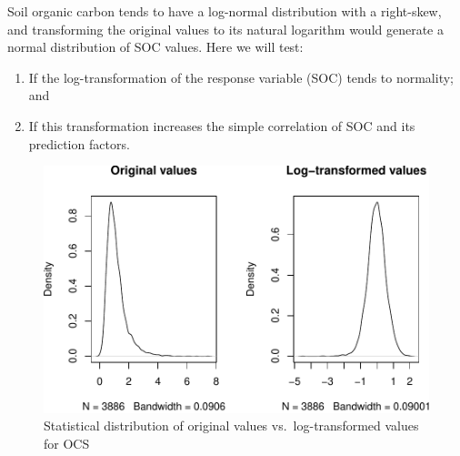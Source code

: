\documentclass[10pt,b5paper,]{book}
\newenvironment{Shaded}{\begin{snugshade}}{\end{snugshade}}
\newcommand{\CommentTok}[1]{\textcolor[rgb]{0.56,0.35,0.01}{\textit{#1}}}
\newcommand{\DataTypeTok}[1]{\textcolor[rgb]{0.13,0.29,0.53}{#1}}
\newcommand{\DecValTok}[1]{\textcolor[rgb]{0.00,0.00,0.81}{#1}}
\newcommand{\KeywordTok}[1]{\textcolor[rgb]{0.13,0.29,0.53}{\textbf{#1}}}
\newcommand{\NormalTok}[1]{#1}
\newcommand{\OperatorTok}[1]{\textcolor[rgb]{0.81,0.36,0.00}{\textbf{#1}}}
\newcommand{\StringTok}[1]{\textcolor[rgb]{0.31,0.60,0.02}{#1}}
\providecommand{\tightlist}{%
  \setlength{\itemsep}{0pt}\setlength{\parskip}{0pt}}
\theoremstyle{definition}
\theoremstyle{definition}
\theoremstyle{definition}
\theoremstyle{remark}
\begin{document}
Soil organic carbon tends to have a log-normal distribution with a
right-skew, and transforming the original values to its natural
logarithm would generate a normal distribution of SOC values. Here we
will test:

\begin{enumerate}
\def\labelenumi{\arabic{enumi}.}
\tightlist
\item
  If the log-transformation of the response variable (SOC) tends to
  normality; and
\item
  If this transformation increases the simple correlation of SOC and its
  prediction factors.
\end{enumerate}

\begin{Shaded}
\end{Shaded}

\begin{figure}
\centering
\includegraphics{SOCMapping_files/figure-latex/unnamed-chunk-16-1.pdf}
\caption{\label{fig:unnamed-chunk-16}Statistical distribution of original
values vs.~log-transformed values for OCS}
\end{figure}
\end{document}
